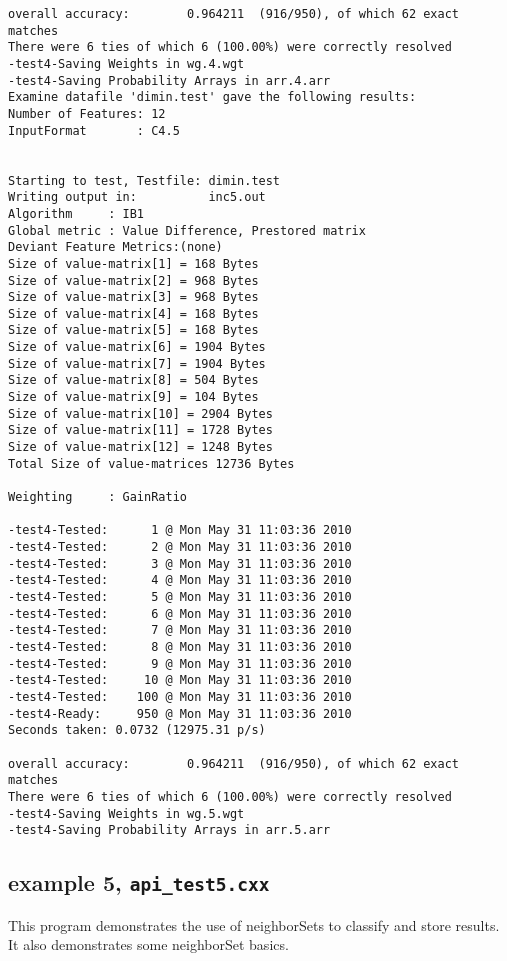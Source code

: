 \documentclass{report}
\begin{document}
\begin{footnotesize}
\begin{verbatim}
overall accuracy:        0.964211  (916/950), of which 62 exact matches 
There were 6 ties of which 6 (100.00%) were correctly resolved
-test4-Saving Weights in wg.4.wgt
-test4-Saving Probability Arrays in arr.4.arr
Examine datafile 'dimin.test' gave the following results:
Number of Features: 12
InputFormat       : C4.5


Starting to test, Testfile: dimin.test
Writing output in:          inc5.out
Algorithm     : IB1
Global metric : Value Difference, Prestored matrix
Deviant Feature Metrics:(none)
Size of value-matrix[1] = 168 Bytes 
Size of value-matrix[2] = 968 Bytes 
Size of value-matrix[3] = 968 Bytes 
Size of value-matrix[4] = 168 Bytes 
Size of value-matrix[5] = 168 Bytes 
Size of value-matrix[6] = 1904 Bytes 
Size of value-matrix[7] = 1904 Bytes 
Size of value-matrix[8] = 504 Bytes 
Size of value-matrix[9] = 104 Bytes 
Size of value-matrix[10] = 2904 Bytes 
Size of value-matrix[11] = 1728 Bytes 
Size of value-matrix[12] = 1248 Bytes 
Total Size of value-matrices 12736 Bytes 

Weighting     : GainRatio

-test4-Tested:      1 @ Mon May 31 11:03:36 2010
-test4-Tested:      2 @ Mon May 31 11:03:36 2010
-test4-Tested:      3 @ Mon May 31 11:03:36 2010
-test4-Tested:      4 @ Mon May 31 11:03:36 2010
-test4-Tested:      5 @ Mon May 31 11:03:36 2010
-test4-Tested:      6 @ Mon May 31 11:03:36 2010
-test4-Tested:      7 @ Mon May 31 11:03:36 2010
-test4-Tested:      8 @ Mon May 31 11:03:36 2010
-test4-Tested:      9 @ Mon May 31 11:03:36 2010
-test4-Tested:     10 @ Mon May 31 11:03:36 2010
-test4-Tested:    100 @ Mon May 31 11:03:36 2010
-test4-Ready:     950 @ Mon May 31 11:03:36 2010
Seconds taken: 0.0732 (12975.31 p/s)

overall accuracy:        0.964211  (916/950), of which 62 exact matches 
There were 6 ties of which 6 (100.00%) were correctly resolved
-test4-Saving Weights in wg.5.wgt
-test4-Saving Probability Arrays in arr.5.arr
\end{verbatim}
\end{footnotesize}
\clearpage

\subsection{example 5, {\tt api\_test5.cxx}}

This program demonstrates the use of neighborSets to classify and
store results. It also demonstrates some neighborSet basics.
\end{document}
